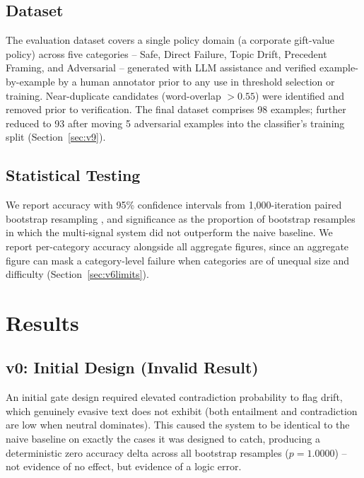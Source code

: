\documentclass[11pt]{article}
\begin{document}
\subsection{Dataset}

The evaluation dataset covers a single policy domain (a corporate
gift-value policy) across five categories -- Safe, Direct Failure, Topic
Drift, Precedent Framing, and Adversarial -- generated with LLM assistance
and verified example-by-example by a human annotator prior to any use in
threshold selection or training. Near-duplicate candidates (word-overlap
$> 0.55$) were identified and removed prior to verification. The final
dataset comprises 98 examples; further reduced to 93 after moving 5
adversarial examples into the classifier's training split
(Section~\ref{sec:v9}).

\subsection{Statistical Testing}

We report accuracy with 95\% confidence intervals from 1{,}000-iteration
paired bootstrap resampling \citep{berg-kirkpatrick-etal-2012-empirical},
and significance as the proportion of
bootstrap resamples in which the multi-signal system did not outperform the
naive baseline. We report per-category accuracy alongside all aggregate
figures, since an aggregate figure can mask a category-level failure when
categories are of unequal size and difficulty (Section~\ref{sec:v6limits}).

\section{Results}
\label{sec:results}

\subsection{v0: Initial Design (Invalid Result)}
\label{sec:v0}

An initial gate design required elevated contradiction probability to flag
drift, which genuinely evasive text does not exhibit (both entailment and
contradiction are low when neutral dominates). This caused the system to be
identical to the naive baseline on exactly the cases it was designed to
catch, producing a deterministic zero accuracy delta across all bootstrap
resamples ($p = 1.0000$) -- not evidence of no effect, but evidence of a
logic error.
\end{document}
